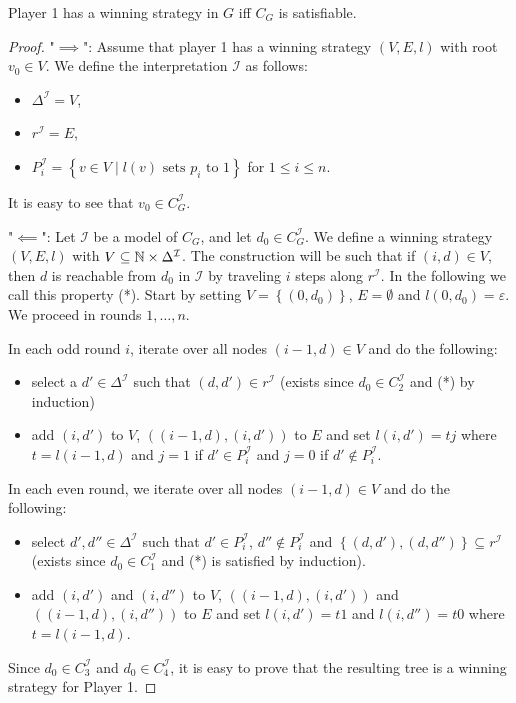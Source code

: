 \begin{lemma}
	Player 1 has a winning strategy in $G$ iff $C_G$ is satisfiable.
\end{lemma}
\begin{proof}
	"$ \implies$":
	Assume that player 1 has a winning strategy $\left( V, E, l \right)$ with root $v_0 \in V$.
	We define the interpretation $\mathcal{I}$ as follows:
	\begin{itemize}
		\item $\Delta^{\mathcal{I}} = V$,
		\item $r^{\mathcal{I}} = E$,
		\item $P_i^{\mathcal{I}} = \left\{ v \in V \mid l(v)  \text{ sets $p_i$ to 1} \right\}$ 
			for $1 \leq i \leq n$.
	\end{itemize}
	It is easy to see that $v_0 \in C_G^\mathcal{I}$.

	"$ \impliedby$":
	Let $\mathcal{I}$ be a model of $C_G$, and let $d_0 \in C_G^\mathcal{I}$.
	We define a winning strategy $\left( V,E,l \right)$ with $V \subseteq \mathbb{N} \times \Delta^\mathcal{I}$.
	The construction will be such that 
	if $(i,d) \in V$, then $d$ is reachable from $d_0$ in $\mathcal{I}$ 
	by traveling  $i$ steps along $r^\mathcal{I}$.
	In the following we call this property (*). 
	Start by setting $V = \left\{ (0,d_0) \right\}$, $E = \emptyset$ and $l(0,d_0) = \varepsilon$.
	We proceed in rounds $1, \ldots, n$.

	In each odd round $i$, iterate over all nodes $(i-1,d) \in V$ and do the following:
	\begin{itemize}
		\item select a $d' \in \Delta^\mathcal{I}$ such that $(d, d') \in r^\mathcal{I}$
			(exists since $d_0 \in C_2^\mathcal{I}$ and (*) by induction)
		\item add $(i, d')$ to  $V$, $\left( (i-1,d),(i,d') \right)$ to $E$
			and set  $l(i,d') = tj$ where  $t = l(i-1,d)$
			and  $j = 1$ if $d' \in P_i^{\mathcal{I}}$
			and $j = 0$ if  $d' \notin P_i^{\mathcal{I}}$.
	\end{itemize}

	In each even round, we iterate over all nodes $(i-1, d) \in V$ and do the following:
	\begin{itemize}
		\item select $d', d'' \in \Delta^\mathcal{I}$ such that $d' \in P_i^\mathcal{I}$,
			$d '' \notin P_i^\mathcal{I}$ and $\left\{ (d,d'), (d,d'') \right\} \subseteq r^\mathcal{I}$ 
			(exists since $d_0 \in C_1^{\mathcal{I}}$ and (*) is satisfied by induction).
		\item add $(i,d')$ and $(i, d'')$ to $V$,
			$\left( (i-1, d), (i,d') \right)$ and $\left( (i-1,d),(i,d'') \right)$ to $E$ 
			and set $l(i,d') = t1$ and $l(i,d'') = t0$
			where $t = l(i-1,d)$.
	\end{itemize}
	Since $d_0 \in C_3^\mathcal{I}$ and $d_0 \in C_4^\mathcal{I}$, it is easy to prove
	that the resulting tree is a winning strategy for Player 1.
\end{proof}

